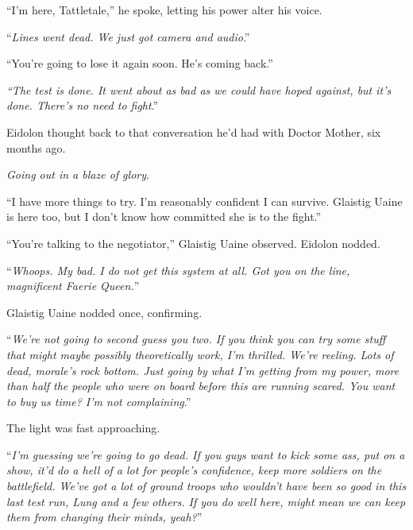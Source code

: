 ``I'm here, Tattletale,'' he spoke, letting his power alter his voice.



``\emph{Lines went dead.  We just got camera and audio}.''



``You're going to lose it again soon.  He's coming back.''



\emph{``The test is done.  It went about as bad as we could have hoped against, but it's done.  There's no need to fight}.''



Eidolon thought back to that conversation he'd had with Doctor Mother, six months ago.



\emph{Going out in a blaze of glory}.



``I have more things to try.  I'm reasonably confident I can survive.  Glaistig Uaine is here too, but I don't know how committed she is to the fight.''



``You're talking to the negotiator,'' Glaistig Uaine observed.  Eidolon nodded.



``\emph{Whoops.  My bad.  I do not get this system at all.  Got you on the line, magnificent Faerie Queen.}''



Glaistig Uaine nodded once, confirming.



``\emph{We're not going to second guess you two.  If you think you can try some stuff that might maybe possibly theoretically work, I'm thrilled.  We're reeling.  Lots of dead, morale's rock bottom.  Just going by what I'm getting from my power, more than half the people who were on board before this are running scared.  You want to buy us time?  I'm not complaining}.''



The light was fast approaching.



``\emph{I'm guessing we're going to go dead.  If you guys want to kick some ass, put on a show, it'd do a hell of a lot for people's confidence, keep more soldiers on the battlefield. We've got a lot of ground troops who wouldn't have been so good in this last test run, Lung and a few others.  If you do well here, might mean we can keep them from changing their minds, yeah?}''



